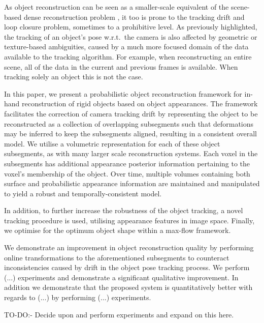 As object reconstruction can be seen as a smaller-scale equivalent of the scene-based dense reconstruction problem , it too is prone to the
tracking drift and loop closure problem, sometimes to a prohibitive level. As previously highlighted, the tracking of an object's pose w.r.t.\ the camera is also affected 
by geometric or texture-based ambiguities, caused by a much more focused domain of the data available to the tracking algorithm. For example, when reconstructing an 
entire scene, all of the data in the current and previous frames is available. When tracking solely an object this is not the case.

In this paper, we present a probabilistic object reconstruction framework for in-hand reconstruction of rigid objects based on object
appearances. The framework facilitates the correction of camera tracking drift by representing the object to be reconstructed as a
collection of overlapping subsegments such that deformations may be inferred to keep the subsegments aligned, resulting in a consistent
overall model. We utilise a volumetric representation for each of these object subsegments, as with many larger scale reconstruction
systems\cite{Kahler2016}. Each voxel in the subsegments has additional appearance posterior information pertaining to the voxel's membership of the object.
Over time, multiple volumes containing both surface and probabilistic appearance information are maintained and manipulated to yield a
robust and temporally-consistent model.

In addition, to further increase the robustness of the object tracking, a novel tracking procedure is used, utilising appearance features
in image space. Finally, we optimise for the optimum object shape within a max-flow framework.

We demonstrate an improvement in object reconstruction quality by performing online transformations to the aforementioned subsegments to counteract inconsistencies 
caused by drift in the object pose tracking process. 
We perform (...) experiments and demonstrate a significant qualitative improvement. In addition we demonstrate that the proposed system is quantitatively better 
with regards to (...) by performing (...) experiments.

TO-DO:- Decide upon and perform experiments and expand on this here.